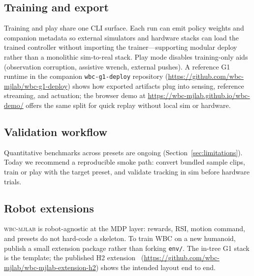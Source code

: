 \documentclass[11pt,a4paper]{article}
\begin{document}
\subsection{Training and export}
Training and play share one CLI surface. Each run can emit policy weights and
companion metadata so external simulators and hardware stacks can load the
trained controller without importing the trainer---supporting modular deploy
rather than a monolithic sim-to-real stack. Play mode disables training-only
aids (observation corruption, assistive wrench, external pushes). A reference
G1 runtime in the companion \texttt{wbc-g1-deploy} repository
(\url{https://github.com/wbc-mjlab/wbc-g1-deploy}) shows how exported artifacts
plug into sensing, reference streaming, and actuation; the browser demo at
\url{https://wbc-mjlab.github.io/wbc-demo/} offers the same split for quick
replay without local sim or hardware.

\subsection{Validation workflow}
\label{sec:validation}
Quantitative benchmarks across presets are ongoing (Section~\ref{sec:limitations}).
Today we recommend a reproducible smoke path: convert bundled sample clips,
train or play with the target preset, and validate tracking in sim before
hardware trials.

\subsection{Robot extensions}
\label{sec:extensions}
\textsc{wbc-mjlab} is robot-agnostic at the MDP layer: rewards, RSI, motion
command, and presets do not hard-code a skeleton. To train WBC on a new
humanoid, publish a small extension package rather than forking \texttt{env/}.
The in-tree G1 stack is the template; the published H2 extension~\citep{wbc_h2_ext}
(\url{https://github.com/wbc-mjlab/wbc-mjlab-extension-h2}) shows the intended
layout end to end.
\end{document}
